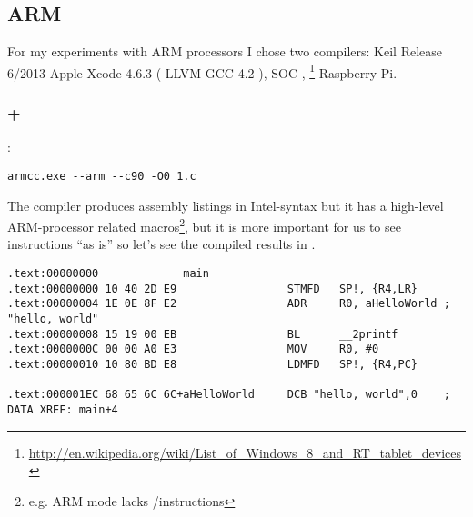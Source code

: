﻿\subsection{ARM}
\label{sec:hw_ARM}

\index{\idevices}
{For my experiments with ARM processors I chose two compilers}: 
 Keil Release 6/2013 
 Apple Xcode 4.6.3  ( LLVM-GCC 4.2 ), 
 \ac{SOC} \InENRU \idevices, 
\footnote{\url{http://en.wikipedia.org/wiki/List_of_Windows_8_and_RT_tablet_devices}} 
 Raspberry Pi.

\subsubsection{\NonOptimizingKeil + \ARMMode}

:

\begin{lstlisting}
armcc.exe --arm --c90 -O0 1.c 
\end{lstlisting}

\index{\IntelSyntax}
{The  compiler produces assembly listings in Intel-syntax} 
{but it has a high-level ARM-processor related macros}\footnote{
{e.g. ARM mode lacks \PUSH/\POP instructions}}, 
{but it is more important for us to see instructions ``as is'' so let's see the compiled results in \IDA}.

\begin{lstlisting}[caption=\NonOptimizingKeil + \ARMMode + \IDA]
.text:00000000             main
.text:00000000 10 40 2D E9                 STMFD   SP!, {R4,LR}
.text:00000004 1E 0E 8F E2                 ADR     R0, aHelloWorld ; "hello, world"
.text:00000008 15 19 00 EB                 BL      __2printf
.text:0000000C 00 00 A0 E3                 MOV     R0, #0
.text:00000010 10 80 BD E8                 LDMFD   SP!, {R4,PC}

.text:000001EC 68 65 6C 6C+aHelloWorld     DCB "hello, world",0    ; DATA XREF: main+4
\end{lstlisting}

